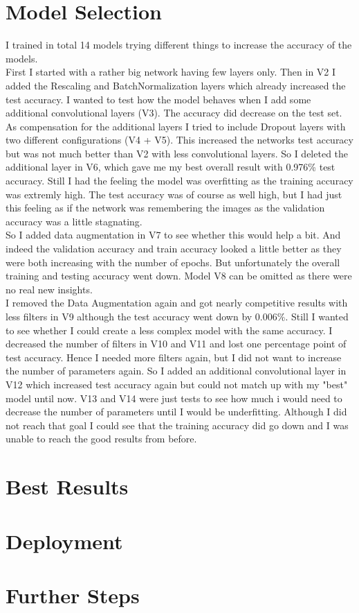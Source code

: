\documentclass[]{article}
\begin{document}
\section{Model Selection}
I trained in total 14 models trying different things to increase the accuracy of the models.\\
First I started with a rather big network having few layers only. Then in V2 I added the Rescaling and BatchNormalization layers which already increased the test accuracy. I wanted to test how the model behaves when I add some additional convolutional layers (V3). The accuracy did decrease on the test set. As compensation for the additional layers I tried to include Dropout layers with two different configurations (V4 + V5). This increased the networks test accuracy but was not much better than V2 with less convolutional layers. So I deleted the additional layer in V6, which gave me my best overall result with 0.976\% test accuracy. Still I had the feeling the model was overfitting as the training accuracy was extremly high. The test accuracy was of course as well high, but I had just this feeling as if the network was remembering the images as the validation accuracy was a little stagnating.\\
So I added data augmentation in V7 to see whether this would help a bit. And indeed the validation accuracy and train accuracy looked a little better as they were both increasing with the number of epochs. But unfortunately the overall training and testing accuracy went down. Model V8 can be omitted as there were no real new insights.\\
I removed the Data Augmentation again and got nearly competitive results with less filters in V9 although the test accuracy went down by 0.006\%. Still I wanted to see whether I could create a less complex model with the same accuracy. I decreased the number of filters in V10 and V11 and lost one percentage point of test accuracy. Hence I needed more filters again, but I did not want to increase the number of parameters again. So I added an additional convolutional layer in V12 which increased test accuracy again but could not match up with my "best" model until now. V13 and V14 were just tests to see how much i would need to decrease the number of parameters until I would be underfitting. Although I did not reach that goal I could see that the training accuracy did go down and I was unable to reach the good results from before.
\section{Best Results}
\section{Deployment}
\section{Further Steps}
\end{document}

